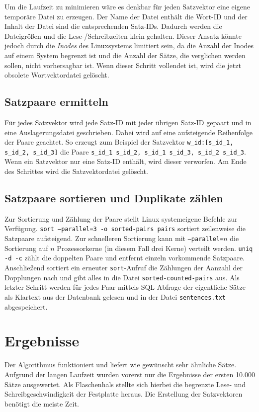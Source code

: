 \documentclass[a4paper,11pt,utf8]{scrartcl}
\begin{document}
Um die Laufzeit zu minimieren wäre es denkbar für jeden Satzvektor eine eigene temporäre Datei zu erzeugen. Der Name der Datei enthält die Wort-ID und der Inhalt der Datei sind die entsprechenden Satz-IDs. Dadurch werden die Dateigrößen und die Lese-/Schreibzeiten klein gehalten. Dieser Ansatz könnte jedoch durch die \emph{Inodes} des Linuxsystems limitiert sein, da die Anzahl der Inodes auf einem System begrenzt ist und die Anzahl der Sätze, die verglichen werden sollen, nicht vorhersagbar ist. Wenn dieser Schritt vollendet ist, wird die jetzt obsolete Wortvektordatei gelöscht.

\subsection{Satzpaare ermitteln}
Für jedes Satzvektor wird jede Satz-ID mit jeder übrigen Satz-ID gepaart und in eine Auslagerungsdatei geschrieben. Dabei wird auf eine aufsteigende Reihenfolge der Paare geachtet. So erzeugt zum Beispiel der Satzvektor \texttt{w\_id:[s\_id\_1, s\_id\_2, s\_id\_3]} die Paare \texttt{s\_id\_1 s\_id\_2, s\_id\_1 s\_id\_3, s\_id\_2 s\_id\_3}. Wenn ein Satzvektor nur eine Satz-ID enthält, wird dieser verworfen. Am Ende des Schrittes wird die Satzvektordatei gelöscht.

\subsection{Satzpaare sortieren und Duplikate zählen}
Zur Sortierung und Zählung der Paare stellt Linux systemeigene Befehle zur Verfügung. \texttt{sort --parallel=3 -o sorted-pairs pairs} sortiert zeilenweise die Satzpaare aufsteigend. Zur schnelleren Sortierung kann mit \texttt{--parallel=$n$} die Sortierung auf $n$ Prozessorkerne (in diesem Fall drei Kerne) verteilt werden. \texttt{uniq -d -c} zählt die doppelten Paare und entfernt einzeln vorkommende Satzpaare. Anschließend sortiert ein erneuter \texttt{sort}-Aufruf die Zählungen der Aanzahl der Dopplungen nach und gibt alles in die Datei \texttt{sorted-counted-pairs} aus. Als letzter Schritt werden für jedes Paar mittels SQL-Abfrage der eigentliche Sätze als Klartext aus der Datenbank gelesen und in der Datei \texttt{sentences.txt} abgespeichert.

\section{Ergebnisse}
Der Algorithmus funktioniert und liefert wie gewünscht sehr ähnliche Sätze. Aufgrund der langen Laufzeit wurden vorerst nur die Ergebnisse der ersten 10.000 Sätze ausgewertet. Als Flaschenhals stellte sich hierbei die begrenzte Lese- und Schreibgeschwindigkeit der Festplatte heraus. Die Erstellung der Satzvektoren benötigt die meiste Zeit. 
\end{document}
